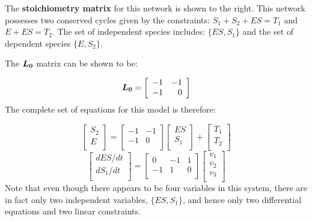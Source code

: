 \documentclass[]{article}
\begin{document}
\begin{boxedminipage}[hbp]{14cm}
\vspace{12pt} The {\bfseries stoichiometry matrix} for this
network is shown to the right. This network possesses two
conserved cycles given by the constraints: $S_1 + S_2 + ES = T_1$
and $E + ES = T_2$. The set of independent species includes:
$\{ES, S_1\}$ and the set of dependent species $\{E, S_2 \}$.

\bigskip
The $\mbox{\boldmath $L_0$}$ matrix can be shown to be:

\hspace{2cm} $$ \mbox{\boldmath $L_0$} = \left[ \begin{array}{rr}
    -1 & -1 \\
    -1 & 0 \\
\end{array}  \right]$$ \hfill
%
\linebreak
The complete set of equations for this model is therefore:

$$
\left[ \begin{array}{l}
    S_2 \\
    E \\
\end{array} \right] =
\left[ \begin{array}{rr}
    -1 & -1 \\
    -1 & 0 \\
\end{array}  \right]
\left[
\begin{array}{l}
        ES \\
        S_1 \\
\end{array}
\right] +
\left[
\begin{array}{l}
    T_1 \\
    T_2 \\
\end{array}
\right]$$
$$\left[
\begin{array}{l}
    dES/dt \\
    dS_1/dt \\
\end{array}
\right] =
\left[
\begin{array}{rrr}
    0 & -1 & 1 \\
    -1 & 1 & 0 \\
\end{array}
\right]
\left[
\begin{array}{l}
    v_1 \\
    v_2 \\
    v_3 \\
\end{array}
\right]$$ Note that even though there appears to be four variables
in this system, there are in fact only two independent variables, $\{ES, S_1\}$,
and hence only two differential equations and two linear constraints.

\end{boxedminipage}
\end{document}
